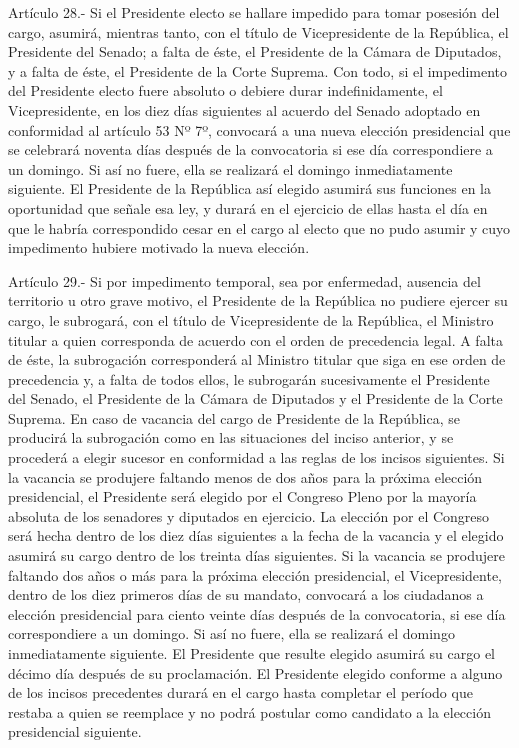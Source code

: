     Artículo 28.- Si el Presidente electo se hallare impedido para tomar posesión del cargo, asumirá, mientras tanto, con el título de Vicepresidente de la República, el Presidente del Senado; a falta de éste, el Presidente de la Cámara de Diputados, y a falta de éste, el Presidente de la Corte Suprema.
    Con todo, si el impedimento del Presidente electo fuere absoluto o debiere durar indefinidamente, el Vicepresidente, en los diez días siguientes al acuerdo del Senado adoptado en conformidad al artículo 53 Nº 7º, convocará a una nueva elección presidencial que se celebrará noventa días después de la convocatoria si ese día correspondiere a un domingo. Si así no fuere, ella se realizará el domingo inmediatamente siguiente. El Presidente de la República así elegido asumirá sus funciones en la oportunidad que señale esa ley, y durará en el ejercicio de ellas hasta el día en que le habría correspondido cesar en el cargo al electo que no pudo asumir y cuyo impedimento hubiere motivado la nueva elección.



    Artículo 29.- Si por impedimento temporal, sea por enfermedad, ausencia del territorio u otro grave motivo, el Presidente de la República no pudiere ejercer su cargo, le subrogará, con el título de Vicepresidente de la República, el Ministro titular a quien corresponda de acuerdo con el orden de precedencia legal. A falta de éste, la subrogación corresponderá al Ministro titular que siga en ese orden de precedencia y, a falta de todos ellos, le subrogarán sucesivamente el Presidente del Senado, el Presidente de la Cámara de Diputados y el Presidente de la Corte Suprema.
    En caso de vacancia del cargo de Presidente de la República, se producirá la subrogación como en las situaciones del inciso anterior, y se procederá a elegir sucesor en conformidad a las reglas de los incisos siguientes.
    Si la vacancia se produjere faltando menos de dos años para la próxima elección presidencial, el Presidente será elegido por el Congreso Pleno por la mayoría absoluta de los senadores y diputados en ejercicio. La elección por el Congreso será hecha dentro de los diez días siguientes a la fecha de la vacancia y el elegido asumirá su cargo dentro de los treinta días siguientes.
    Si la vacancia se produjere faltando dos años o más para la próxima elección presidencial, el Vicepresidente, dentro de los diez primeros días de su mandato, convocará a los ciudadanos a elección presidencial para ciento veinte días después de la convocatoria, si ese día correspondiere a un domingo. Si así no fuere, ella se realizará el domingo inmediatamente siguiente. El Presidente que resulte elegido asumirá su cargo el décimo día después de su proclamación.
    El Presidente elegido conforme a alguno de los incisos precedentes durará en el cargo hasta completar el período que restaba a quien se reemplace y no podrá postular como candidato a la elección presidencial siguiente.



